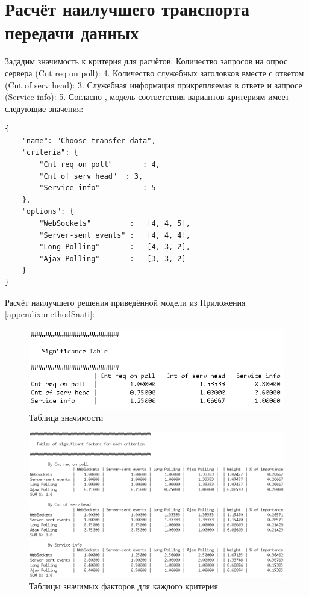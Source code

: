 \chapter{Расчёт наилучшего транспорта передачи данных} \label{appendix:calculBestTransferDataWay}

Зададим значимость к критерия для расчётов. Количество запросов  на опрос сервера (Cnt req on poll): 4. Количество служебных заголовков вместе с ответом (Cnt of serv head): 3. Служебная информация прикрепляемая в ответе и запросе (Service info): 5. Согласно , модель соответствия вариантов критериям имеет следующие значения:

\begin{lstlisting}
{
	"name": "Choose transfer data",
	"criteria": { 
		"Cnt req on poll"		: 4,
		"Cnt of serv head"	: 3,
		"Service info"			: 5
	},
	"options": {
		"WebSockets"         :   [4, 4, 5],
		"Server-sent events" :   [4, 4, 4],
		"Long Polling"       :   [4, 3, 2],
		"Ajax Polling"       :   [3, 3, 2]
	} 
}
\end{lstlisting}

Расчёт наилучшего решения приведённой модели из Приложения \ref{appendix:methodSaati}:

\begin{figure}
	\centering
	\includegraphics[width=1\linewidth]{my_folder/images/ATransferData1}
	\caption{Таблица значимости}
	\label{fig:atransferdata1}
\end{figure}

\begin{figure}
	\centering
	\includegraphics[scale=0.7, angle=270]{my_folder/images/ATransferData2}
	\caption{Таблицы значимых факторов для каждого критерия}
	\label{fig:atransferdata2}
\end{figure}

